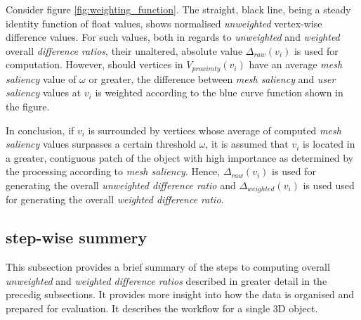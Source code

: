 Consider figure \ref{fig:weighting_function}. The straight, black line, being a steady identity function of float values, shows normalised \textit{unweighted} vertex-wise difference values. For such values, both in regards to \textit{unweighted} and \textit{weighted} overall \textit{difference ratios}, their unaltered, absolute value $\Delta_{raw}(v_i)$ is used for computation. However, should vertices in $V_{proximty}(v_i)$ have an average \textit{mesh saliency} value of $\omega$ or greater, the difference between \textit{mesh saliency} and \textit{user saliency} values at $v_i$ is weighted according to the blue curve function shown in the figure.

In conclusion, if $v_i$ is surrounded by vertices whose average of computed \textit{mesh saliency} values surpasses a certain threshold $\omega$, it is assumed that $v_i$ is located in a greater, contiguous patch of the object with high importance as determined by the processing according to \textit{mesh saliency}. Hence, $\Delta_{raw}(v_i)$ is used for generating the overall \textit{unweighted difference ratio} and $\Delta_{weighted}(v_i)$ is used used for generating the overall \textit{weighted difference ratio}.

		\subsection{step-wise summery}
		\label{sec:ste_wise_summery}
This subsection provides a brief summary of the steps to computing overall \textit{unweighted} and \textit{weighted difference ratios} described in greater detail in the precedig subsections. It provides more insight into how the data is organised and prepared for evaluation. It describes the workflow for a single 3D object.

